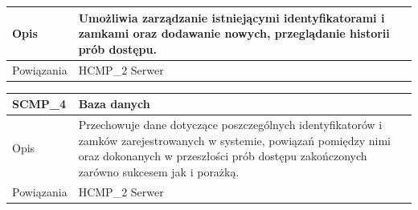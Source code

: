 \begin{table}
\begin{subtable}[c]{\textwidth}
\begin{tabular}{|p{2cm}|p{12cm}|}
                            \hline \cellcolor[gray]{0.8} Opis         & Umożliwia zarządzanie istniejącymi identyfikatorami i zamkami oraz dodawanie nowych, przeglądanie historii prób dostępu. \\
                            \hline \cellcolor[gray]{0.8} Powiązania   & HCMP\_2 Serwer    \\
                            \hline
                        \end{tabular}
                        \label{tbl:scmp3}
                        \vspace{10mm}           
                    \end{subtable}                 
                \quad%
                    \begin{subtable}[c]{\textwidth}
                        \centering
                        \begin{tabular}{|p{2cm}|p{12cm}|}
                            \hline SCMP\_4      & \textbf{Baza danych} \\
                            \hline \cellcolor[gray]{0.8} Opis         & Przechowuje dane dotyczące poszczególnych identyfikatorów i zamków zarejestrowanych w systemie, powiązań pomiędzy nimi oraz dokonanych w przeszłości prób dostępu zakończonych zarówno sukcesem jak i porażką. \\
                            \hline \cellcolor[gray]{0.8} Powiązania   & HCMP\_2 Serwer    \\
                            \hline
                        \end{tabular}
                        \label{tbl:scmp4}     
                    \end{subtable} 
                    \label{tbl:sw_comp}
                \end{table}

        \pagebreak


        \pagebreak

